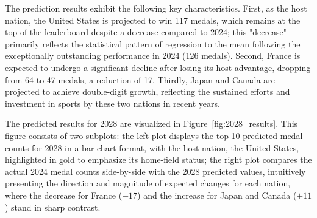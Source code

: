 \documentclass{mcmthesis}
\begin{document}
\begin{table}[H]
\centering
\caption{2028 Los Angeles Olympics Medal Prediction (TOP 10)}
\label{tab:2028_prediction}
\end{table}
The prediction results exhibit the following key characteristics.
First, as the host nation, the United States is projected to win 117 medals, which remains at the top of the leaderboard despite a decrease compared to 2024; this "decrease" primarily reflects the statistical pattern of regression to the mean following the exceptionally outstanding performance in 2024 (126 medals).
Second, France is expected to undergo a significant decline after losing its host advantage, dropping from 64 to 47 medals, a reduction of 17.
Thirdly, Japan and Canada are projected to achieve double-digit growth, reflecting the sustained efforts and investment in sports by these two nations in recent years.

The predicted results for 2028 are visualized in Figure~\ref{fig:2028_results}. This figure consists of two subplots: the left plot displays the top 10 predicted medal counts for 2028 in a bar chart format, with the host nation, the United States, highlighted in gold to emphasize its home-field status; the right plot compares the actual 2024 medal counts side-by-side with the 2028 predicted values, intuitively presenting the direction and magnitude of expected changes for each nation, where the decrease for France ($-17$) and the increase for Japan and Canada ($+11$) stand in sharp contrast.
\end{document}
